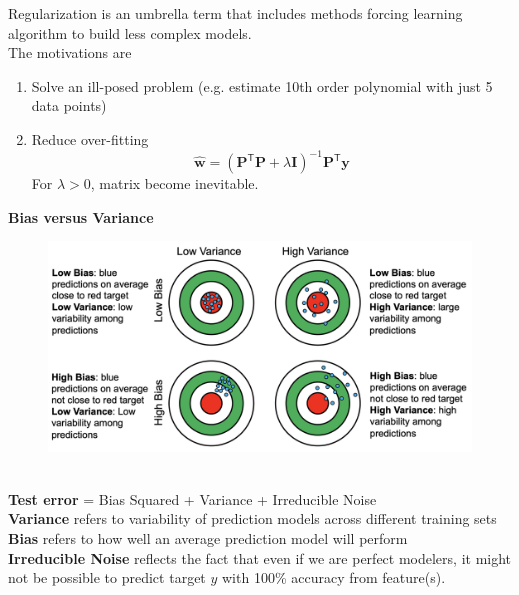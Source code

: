 Regularization is an umbrella term that includes methods forcing learning algorithm to build less complex models.\\
The motivations are 
\begin{enumerate}
    \item Solve an ill-posed problem (e.g. estimate 10th order polynomial with just 5 data points)
    \item Reduce over-fitting 
    \[\hat{\mathbf{w}} = (\mathbf{P}^\mathsf{T}\mathbf{P} + \lambda \mathbf{I})^{-1}\mathbf{P}^\mathsf{T}\mathbf{y}\]
    For $\lambda > 0$, matrix become inevitable.
\end{enumerate}
\textbf{Bias versus Variance}
\begin{figure}[h]
    \centering
    \includegraphics[width=1\linewidth]{image/bias_virance.png}
\end{figure}\\
\textbf{Test error} = Bias Squared + Variance + Irreducible Noise \\
\textbf{Variance} refers to variability of prediction models across different training sets \\
\textbf{Bias} refers to how well an average prediction model will perform\\
\textbf{Irreducible Noise} reflects the fact that even if we are perfect modelers, it might not be possible to predict target $y$ with 100\% accuracy from feature(s).
